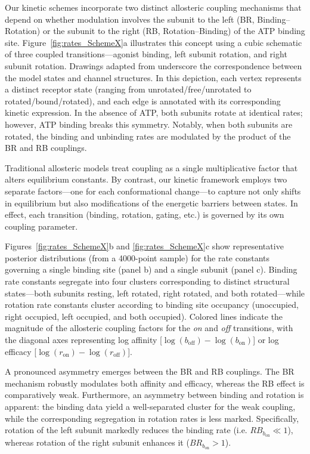 \documentclass[pdflatex,sn-nature]{sn-jnl}%
\theoremstyle{thmstyleone}%
\theoremstyle{thmstyletwo}%
\theoremstyle{thmstylethree}%
\begin{document}
Our kinetic schemes incorporate two distinct allosteric coupling mechanisms that depend on whether modulation involves the subunit to the left (BR, Binding–Rotation) or the subunit to the right (RB, Rotation–Binding) of the ATP binding site. Figure~\ref{fig:rates_SchemeX}a illustrates this concept using a cubic schematic of three coupled transitions—agonist binding, left subunit rotation, and right subunit rotation. Drawings adapted from \cite{abierta_p2x} underscore the correspondence between the model states and channel structures. In this depiction, each vertex represents a distinct receptor state (ranging from unrotated/free/unrotated to rotated/bound/rotated), and each edge is annotated with its corresponding kinetic expression. In the absence of ATP, both subunits rotate at identical rates; however, ATP binding breaks this symmetry. Notably, when both subunits are rotated, the binding and unbinding rates are modulated by the product of the BR and RB couplings.

Traditional allosteric models treat coupling as a single multiplicative factor that alters equilibrium constants. By contrast, our kinetic framework employs two separate factors—one for each conformational change—to capture not only shifts in equilibrium but also modifications of the energetic barriers between states. In effect, each transition (binding, rotation, gating, etc.) is governed by its own coupling parameter.

Figures~\ref{fig:rates_SchemeX}b and \ref{fig:rates_SchemeX}c show representative posterior distributions (from a 4000-point sample) for the rate constants governing a single binding site (panel b) and a single subunit (panel c). Binding rate constants segregate into four clusters corresponding to distinct structural states—both subunits resting, left rotated, right rotated, and both rotated—while rotation rate constants cluster according to binding site occupancy (unoccupied, right occupied, left occupied, and both occupied). Colored lines indicate the magnitude of the allosteric coupling factors for the \textit{on} and \textit{off} transitions, with the diagonal axes representing log affinity [$\log(b_{\text{off}})-\log(b_{\text{on}})$] or log efficacy [$\log(r_{\text{on}})-\log(r_{\text{off}})$].

A pronounced asymmetry emerges between the BR and RB couplings. The BR mechanism robustly modulates both affinity and efficacy, whereas the RB effect is comparatively weak. Furthermore, an asymmetry between binding and rotation is apparent: the binding data yield a well-separated cluster for the weak coupling, while the corresponding segregation in rotation rates is less marked. Specifically, rotation of the left subunit markedly reduces the binding rate (i.e. $RB_{b_{\text{on}}} \ll 1$), whereas rotation of the right subunit enhances it ($BR_{b_{\text{on}}} > 1$).
\end{document}

